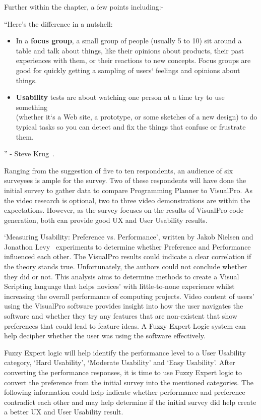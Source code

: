 \documentclass[12pt]{report} %
\begin{document}
	Further within the chapter, a few points including:-
	\begin{center}
		``Here's the difference in a nutshell:
		\begin{itemize}
			\item In a \textbf{focus group}, a small group of people (usually 5 to 10) sit around a table and talk about things, like their opinions about products, their past experiences with them, or their reactions to new concepts. Focus groups are good for quickly getting a sampling of users` feelings and opinions about things.
			\item \textbf{Usability} tests are about watching one person at a time try to use something\\(whether it`s a Web site, a prototype, or some sketches of a new design) to do typical tasks so you can detect and fix the things that confuse or frustrate them.
		\end{itemize}
		'' - Steve Krug~\cite{krug_steve_dont_2014}.
	\end{center}

	Ranging from the suggestion of five to ten respondents, an audience of six surveyees is ample for the survey. Two of these respondents will have done the initial survey to gather data to compare Programming Planner to VisualPro. As the video research is optional, two to three video demonstrations are within the expectations. However, as the survey focuses on the results of VisualPro code generation, both can provide good UX and User Usability results.

	`Measuring Usability: Preference vs. Performance', written by Jakob Nielsen and Jonathon Levy~\cite{nielsen_measuring_1994} experiments to determine whether Preference and Performance influenced each other. The VisualPro results could indicate a clear correlation if the theory stands true.
	Unfortunately, the authors could not conclude whether they did or not. This analysis aims to determine methods to create a Visual Scripting language that helps novices' with little-to-none experience whilst increasing the overall performance of computing projects. Video content of users' using the VisualPro software provides insight into how the user navigates the software and whether they try any features that are non-existent that show preferences that could lead to feature ideas. A Fuzzy Expert Logic system can help decipher whether the user was using the software effectively.

	Fuzzy Expert logic will help identify the performance level to a User Usability category, `Hard Usability', `Moderate Usability' and `Easy Usability'. After converting the performance responses, it is time to use Fuzzy Expert logic to convert the preference from the initial survey into the mentioned categories. The following information could help indicate whether performance and preference contradict each other and may help determine if the initial survey did help create a better UX and User Usability result.
\end{document}
